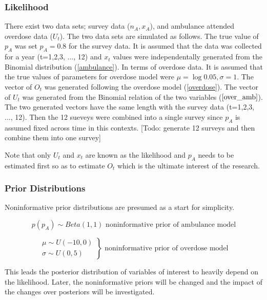 \documentclass[]{article}
\begin{document}
\subsubsection{Likelihood}

\normalsize 
There exist two data sets; survey data ($n_A, x_A$), and ambulance attended overdose data ($U_t$). The two data sets are simulated as follows. 
The true value of $p_A$ was set $p_A=0.8$ for the survey data.
It is assumed that the data was collected for a year (t=1,2,3, ..., 12) and 
$x_t$ values were independentally generated from the Binomial distribution (\ref{ambulance}).  In terms of overdose data. It is assumed that the true values of parameters for overdose model were $\mu=\log0.05, \sigma=1$.
The vector of $O_t$ was generated following the overdose model (\ref{overdose}). The vector of $U_t$ was generated from the Binomial relation of the two variables ($\ref{over_amb}$). The two generated vectors have the same length with the survey data (t=1,2,3, ..., 12). Then the 12 sueveys were combined into a single survey since $p_A$ is assumed fixed across time in this contexts. [Todo: generate 12 surveys and then combine them into one survey]

Note that only $U_t$ and $x_t$ are known as the likelihood and $p_A$ needs to be estimated first so as to estimate $O_t$ which is the ultimate interest of the research.\\


\subsubsection{Prior Distributions}
\normalsize Noninformative prior distributions are presumed as a start for simplicity. 

\begin{equation}
\label{nonin_prior_amb}
p(p_A) \sim Beta(1,1)
\text{			noninformative prior of ambulance model}
\end{equation} 

\begin{equation}
\label{noninprior_over}
\left.\begin{aligned}
\mu \sim U(-10,0)\\
\sigma \sim U(0,5)
\end{aligned}\right\} 
\text{			noninformative prior of overdose model}
\end{equation}

This leads the posterior distribution of variables of interest to heavily depend on the likelihood. Later, the noninformative priors will be changed and the impact of the changes over posteriors will be investigated. \\
\end{document}
